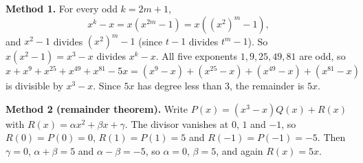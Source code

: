 \textbf{Method 1.} For every odd $k=2m+1$,
\[x^k-x=x\left(x^{2m}-1\right)=x\left(\left(x^2\right)^m-1\right),\]
and $x^2-1$ divides $\left(x^2\right)^m-1$ (since $t-1$ divides $t^m-1$). So $x(x^2-1)=x^3-x$ divides $x^k-x$. All five exponents $1,9,25,49,81$ are odd, so
\[x+x^9+x^{25}+x^{49}+x^{81}-5x=\left(x^9-x\right)+\left(x^{25}-x\right)+\left(x^{49}-x\right)+\left(x^{81}-x\right)\]
is divisible by $x^3-x$. Since $5x$ has degree less than $3$, the remainder is $\boxed{5x}$.

\textbf{Method 2 (remainder theorem).} Write $P(x)=(x^3-x)Q(x)+R(x)$ with $R(x)=\alpha x^2+\beta x+\gamma$. The divisor vanishes at $0$, $1$ and $-1$, so $R(0)=P(0)=0$, $R(1)=P(1)=5$ and $R(-1)=P(-1)=-5$. Then $\gamma=0$, $\alpha+\beta=5$ and $\alpha-\beta=-5$, so $\alpha=0$, $\beta=5$, and again $R(x)=5x$.
